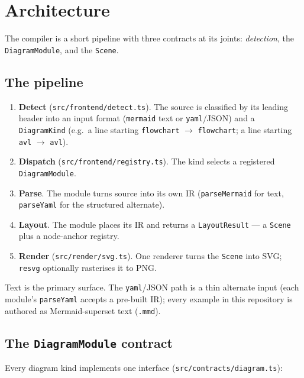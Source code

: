 \section{Architecture}
\label{sec:architecture}

The compiler is a short pipeline with three contracts at its joints:
\emph{detection}, the \texttt{DiagramModule}, and the \texttt{Scene}.

\subsection{The pipeline}

\begin{enumerate}
  \item \textbf{Detect} (\texttt{src/frontend/detect.ts}). The source is
        classified by its leading header into an input format
        (\texttt{mermaid} text or \texttt{yaml}/JSON) and a \texttt{DiagramKind}
        (e.g.\ a line starting \texttt{flowchart} $\to$ \texttt{flowchart}; a
        line starting \texttt{avl} $\to$ \texttt{avl}).
  \item \textbf{Dispatch} (\texttt{src/frontend/registry.ts}). The kind selects
        a registered \texttt{DiagramModule}.
  \item \textbf{Parse}. The module turns source into its own IR
        (\texttt{parseMermaid} for text, \texttt{parseYaml} for the structured
        alternate).
  \item \textbf{Layout}. The module places its IR and returns a
        \texttt{LayoutResult} --- a \texttt{Scene} plus a node-anchor registry.
  \item \textbf{Render} (\texttt{src/render/svg.ts}). One renderer turns the
        \texttt{Scene} into SVG; \texttt{resvg} optionally rasterises it to PNG.
\end{enumerate}

Text is the primary surface. The \texttt{yaml}/JSON path is a thin alternate
input (each module's \texttt{parseYaml} accepts a pre-built IR); every example in
this repository is authored as Mermaid-superset text (\texttt{.mmd}).

\subsection{The \texttt{DiagramModule} contract}
\label{sec:diagram-contract}

Every diagram kind implements one interface
(\texttt{src/contracts/diagram.ts}):

